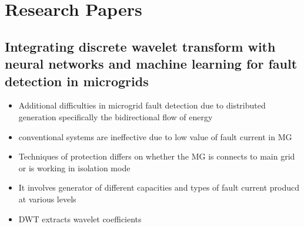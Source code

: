 \documentclass[14pt ,a4paper]{extarticle}
\begin{document}
\section{ Research Papers }

\subsection{Integrating discrete wavelet transform with neural networks and machine
learning for fault detection in microgrids}

\begin{itemize}
    \item{Additional difficulties in microgrid fault detection due to distributed generation specifically the bidirectional flow of energy} 
    \item{conventional systems are ineffective due to low value of fault current in MG}
    \item{Techniques of protection differs on whether the MG is connects to main grid or is working in isolation mode}
    \item{It involves generator of different capacities and types of fault current producd at various levels}
    \item{DWT extracts wavelet coefficients}

\end{itemize}
\end{document}

